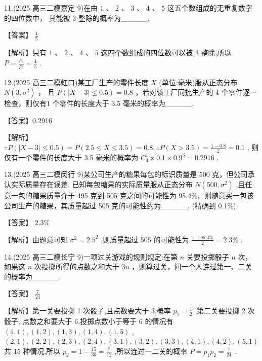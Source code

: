 \documentclass[10pt]{article}
\begin{document}
11.(2025 高三二模嘉定 9)在由 \(1\text{ 、 }2\text{ 、 }3\text{ 、 }4\text{ 、 }5\) 这五个数组成的无重复数字的四位数中， 其能被 3 整除的概率为\_\_\_\_\_.

【答案】 \(\frac{1}{5}\)

【解析】只有 \(1\text{ 、 }2\text{ 、 }4\text{ 、 }5\) 这四个数组成的四位数可以被 3 整除,所以 \(P = \frac{{P}_{4}^{4}}{{P}_{5}^{4}} = \frac{1}{5}\) .

12.(2025 高三二模虹口)某工厂生产的零件长度 \(X\) (单位:毫米)服从正态分布 \(N\left( {3,{\sigma }^{2}}\right)\) ， 且 \(P\left( {\left| {X - 3}\right|  \leq  {0.5}}\right)  = {0.8}\) ，若对该工厂同批生产的 4 个零件逐一检查，则仅有1 个零件的长度大于 3.5 毫米的概率为\_\_\_\_\_.

【答案】0.2916

【解析】 \(\because P\left( {\left| {X - 3}\right|  \leq  {0.5}}\right)  = P\left( {{2.5} \leq  X \leq  {3.5}}\right)  = {0.8},\therefore P\left( {X > {3.5}}\right)  = \frac{1 - {0.8}}{2} = {0.1}\) , 则仅有一个零件的长度大于 3.5 毫米的概率为 \({C}_{4}^{1} \times  {0.1} \times  {0.9}^{3} = {0.2916}\) .

13.(2025 高三二模闵行 9)某公司生产的糖果每包的标识质量是 500 克，但公司承认实际质量存在误差. 已知每包糖果的实际质量服从正态分布 \(N\left( {{500},{\sigma }^{2}}\right)\) ,且任意一包的糖果质量介于 495 克到 505 克之间的可能性为 95.4\%，则随意买一包该公司生产的糖果，其质量超过 505 克的可能性约为\_\_\_\_\_. (精确到 0.1\%)

【答案】 2.3\%

【解析】由题意可知 \({\sigma }^{2} = {2.5}^{2}\) ,则质量超过 505 的可能性为 \(\frac{1 - {95.4}\% }{2} = {2.3}\%\) .

14.(2025 高三二模长宁 9)一项过关游戏的规则规定:在第 \(n\) 关要投掷骰子 \(n\) 次，如果这 \(n\) 次投掷所得的点数之和大于 \({3n}\) ，则算过关，问一个人连过第一、二关的概率为\_\_\_\_\_.

【答案】 \(\frac{7}{24}\)

【解析】第一关要投掷 1 次骰子,且点数要大于 3,概率 \({p}_{1} = \frac{1}{2}\) ,第二关要投掷 2 次骰子, 点数之和要大于 6,投掷点数小于等于 6 的情况有 \(\left( {1,1}\right) ,\left( {1,2}\right) ,\left( {1,3}\right) ,\left( {1,4}\right) ,\left( {1,5}\right)\) , \(\left( {2,1}\right) ,\left( {2,2}\right) ,\left( {2,3}\right) ,\left( {2,4}\right) ,\left( {3,1}\right) ,\left( {3,2}\right) ,\left( {3,3}\right) ,\left( {4,1}\right) ,\left( {4,2}\right) ,\left( {5,1}\right)\) 共 15 种情况,所以 \({p}_{2} = 1 - \frac{15}{36} = \frac{7}{12}\) ,所以连过一二关的概率 \(P = {p}_{1}{p}_{2} = \frac{7}{24}\) .
\end{document}
